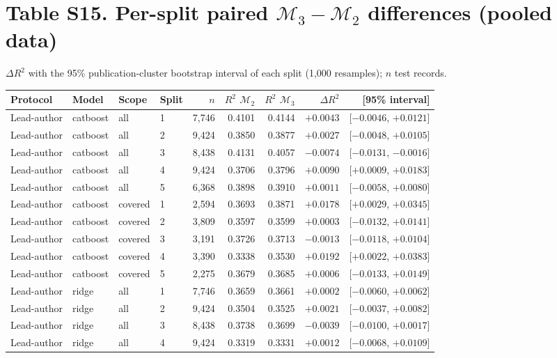 \documentclass[10pt]{article}
\begin{document}
\section*{Table S15. Per-split paired $\mathcal{M}_3-\mathcal{M}_2$ differences (pooled data)}
$\Delta R^2$ with the 95\% publication-cluster bootstrap interval of each split (1,000 resamples); $n$ test records.\par\smallskip
{\footnotesize\begin{longtable}{llllrrrrr}\toprule Protocol & Model & Scope & Split & $n$ & $R^2$ $\mathcal{M}_2$ & $R^2$ $\mathcal{M}_3$ & $\Delta R^2$ & [95\% interval]\\\midrule\endhead
Lead-author & catboost & all & 1 & 7,746 & 0.4101 & 0.4144 & $+0.0043$ & [$-0.0046$, $+0.0121$]\\
Lead-author & catboost & all & 2 & 9,424 & 0.3850 & 0.3877 & $+0.0027$ & [$-0.0048$, $+0.0105$]\\
Lead-author & catboost & all & 3 & 8,438 & 0.4131 & 0.4057 & $-0.0074$ & [$-0.0131$, $-0.0016$]\\
Lead-author & catboost & all & 4 & 9,424 & 0.3706 & 0.3796 & $+0.0090$ & [$+0.0009$, $+0.0183$]\\
Lead-author & catboost & all & 5 & 6,368 & 0.3898 & 0.3910 & $+0.0011$ & [$-0.0058$, $+0.0080$]\\
Lead-author & catboost & covered & 1 & 2,594 & 0.3693 & 0.3871 & $+0.0178$ & [$+0.0029$, $+0.0345$]\\
Lead-author & catboost & covered & 2 & 3,809 & 0.3597 & 0.3599 & $+0.0003$ & [$-0.0132$, $+0.0141$]\\
Lead-author & catboost & covered & 3 & 3,191 & 0.3726 & 0.3713 & $-0.0013$ & [$-0.0118$, $+0.0104$]\\
Lead-author & catboost & covered & 4 & 3,390 & 0.3338 & 0.3530 & $+0.0192$ & [$+0.0022$, $+0.0383$]\\
Lead-author & catboost & covered & 5 & 2,275 & 0.3679 & 0.3685 & $+0.0006$ & [$-0.0133$, $+0.0149$]\\
Lead-author & ridge & all & 1 & 7,746 & 0.3659 & 0.3661 & $+0.0002$ & [$-0.0060$, $+0.0062$]\\
Lead-author & ridge & all & 2 & 9,424 & 0.3504 & 0.3525 & $+0.0021$ & [$-0.0037$, $+0.0082$]\\
Lead-author & ridge & all & 3 & 8,438 & 0.3738 & 0.3699 & $-0.0039$ & [$-0.0100$, $+0.0017$]\\
Lead-author & ridge & all & 4 & 9,424 & 0.3319 & 0.3331 & $+0.0012$ & [$-0.0068$, $+0.0109$]\\

\end{longtable}}
\end{document}
